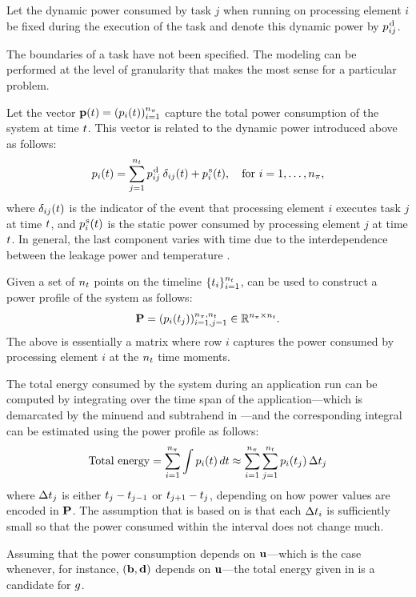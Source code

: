 Let the dynamic power consumed by task $j$ when running on processing element
$i$ be fixed during the execution of the task and denote this dynamic power by
$p^{\text{\kern0.1emd}}_{ij}$.

\begin{remark}
The boundaries of a task have not been specified. The modeling can be performed
at the level of granularity that makes the most sense for a particular problem.
\end{remark}

Let the vector $\mathbf{p}(t) = (p_i(t))_{i = 1}^{{n_\pi}}$ capture the total power
consumption of the system at time $t$. This vector is related to the dynamic
power introduced above as follows:
\begin{equation} \elab{power}
  \p_i(\t) = \sum_{j = 1}^\nt \p^\dynamic_{ij} \: \delta_{ij} (\t) + \p^\static_i(\t), \hspace{1em} \text{for $i = 1, \dots, \np$},
\end{equation}
where $\delta_{ij}(t)$ is the indicator of the event that processing element
$i$ executes task $j$ at time $t$, and $p^{\text{\kern0.1ems}}_i(t)$ is the static power
consumed by processing element $j$ at time $t$. In general, the last component
varies with time due to the interdependence between the leakage power and
temperature \cite{liu2007}.

Given a set of ${n_t}$ points on the timeline $\{ t_i \}_{i = 1}^{n_t}$,
 can be used to construct a power profile of the system as follows:
\[
  \mathbf{P} = (p_i(t_j))_{i = 1, j = 1}^{{n_\pi}, {n_t}} \in \mathbb{R}^{{n_\pi} \times {n_t}}.
\]
The above is essentially a matrix where row $i$ captures the power consumed by
processing element $i$ at the ${n_t}$ time moments.

The total energy consumed by the system during an application run can be
computed by integrating  over the time span of the
application---which is demarcated by the minuend and subtrahend in
---and the corresponding integral can be estimated using
the power profile as follows:
\begin{equation} \elab{total-energy}
  \text{Total energy} = \sum_{i = 1}^\np \int \p_i(\t) \, \d\t \approx \sum_{i = 1}^\np \sum_{j = 1}^\ns \p_i(\t_j) \, \Delta\t_j
\end{equation}
where $\Delta t_j$ is either $t_j - t_{j - 1}$ or $t_{j + 1} - t_j$,
depending on how power values are encoded in $\mathbf{P}$. The assumption that
 is based on is that each $\Delta t_i$ is sufficiently small
so that the power consumed within the interval does not change much.

Assuming that the power consumption depends on $\mathbf{u}$---which is the case
whenever, for instance, $(\mathbf{b}, \mathbf{d})$ depends on $\mathbf{u}$---the total energy given
in  is a candidate for $g$.
